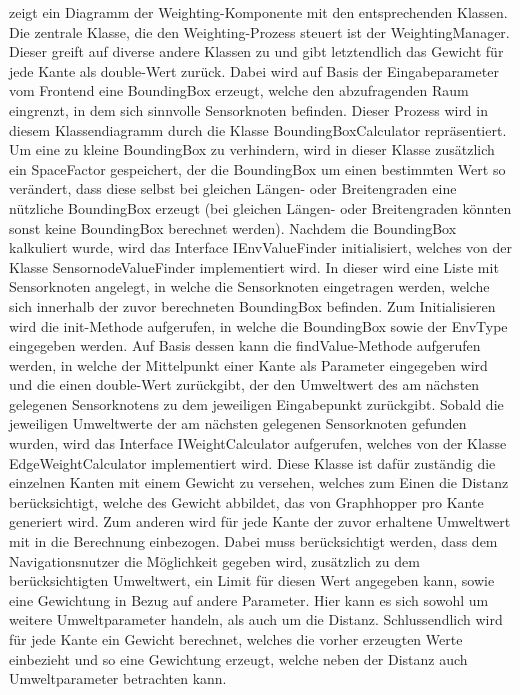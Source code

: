  zeigt ein Diagramm der Weighting-Komponente mit den entsprechenden Klassen. Die zentrale Klasse, die den Weighting-Prozess steuert ist der WeightingManager. Dieser greift auf diverse andere Klassen zu und gibt letztendlich das Gewicht für jede Kante als double-Wert zurück. Dabei wird auf Basis der Eingabeparameter vom Frontend eine BoundingBox erzeugt, welche den abzufragenden Raum eingrenzt, in dem sich sinnvolle Sensorknoten befinden. Dieser Prozess wird in diesem Klassendiagramm durch die Klasse BoundingBoxCalculator repräsentiert. Um eine zu kleine BoundingBox zu verhindern, wird in dieser Klasse zusätzlich ein SpaceFactor gespeichert, der die BoundingBox um einen bestimmten Wert so verändert, dass diese selbst bei gleichen Längen- oder Breitengraden eine nützliche BoundingBox erzeugt (bei gleichen Längen- oder Breitengraden könnten sonst keine BoundingBox berechnet werden). 
Nachdem die BoundingBox kalkuliert wurde, wird das Interface IEnvValueFinder initialisiert, welches von der Klasse SensornodeValueFinder implementiert wird. In dieser wird eine Liste mit Sensorknoten angelegt, in welche die Sensorknoten eingetragen werden, welche sich innerhalb der zuvor berechneten BoundingBox befinden. Zum Initialisieren wird die init-Methode aufgerufen, in welche die BoundingBox sowie der EnvType eingegeben werden. Auf Basis dessen kann die findValue-Methode aufgerufen werden, in welche der Mittelpunkt einer Kante als Parameter eingegeben wird und die einen double-Wert zurückgibt, der den Umweltwert des am nächsten gelegenen Sensorknotens zu dem jeweiligen Eingabepunkt zurückgibt. 
Sobald die jeweiligen Umweltwerte der am nächsten gelegenen Sensorknoten gefunden wurden, wird das Interface IWeightCalculator aufgerufen, welches von der Klasse EdgeWeightCalculator implementiert wird. Diese Klasse ist dafür zuständig die einzelnen Kanten mit einem Gewicht zu versehen, welches zum Einen die Distanz berücksichtigt, welche des Gewicht abbildet, das von Graphhopper pro Kante generiert wird. Zum anderen wird für jede Kante der zuvor erhaltene Umweltwert mit in die Berechnung einbezogen. Dabei muss berücksichtigt werden, dass dem Navigationsnutzer die Möglichkeit gegeben wird, zusätzlich zu dem berücksichtigten Umweltwert, ein Limit für diesen Wert angegeben kann, sowie eine Gewichtung in Bezug auf andere Parameter. Hier kann es sich sowohl um weitere Umweltparameter handeln, als auch um die Distanz.
Schlussendlich wird für jede Kante ein Gewicht berechnet, welches die vorher erzeugten Werte einbezieht und so eine Gewichtung erzeugt, welche neben der Distanz auch Umweltparameter betrachten kann.

